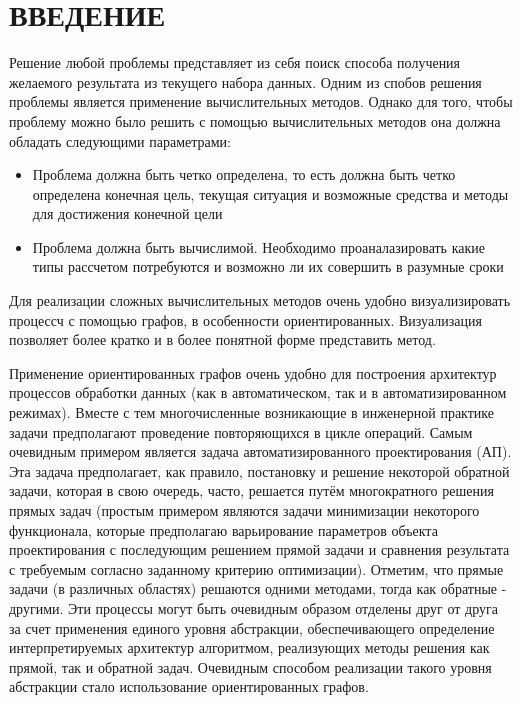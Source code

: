 \chapter*{ВВЕДЕНИЕ}\label{chap.introduction}


Решение любой проблемы представляет из себя поиск способа получения желаемого результата из текущего набора данных. Одним из спобов решения проблемы является применение вычислительных методов. Однако для того, чтобы проблему можно было решить с помощью вычислительных методов она должна обладать следующими параметрами:
\begin{itemize}
	\item Проблема должна быть четко определена, то есть должна быть четко определена конечная цель, текущая ситуация и возможные средства и методы для достижения конечной цели
	\item Проблема должна быть вычислимой. Необходимо проаналазировать какие типы рассчетом потребуются и возможно ли их совершить в разумные сроки
\end{itemize}
Для реализации сложных вычислительных методов очень удобно визуализировать процессч с помощью графов, в особенности ориентированных. Визуализация позволяет более кратко и в более понятной форме представить метод.

Применение ориентированных графов очень удобно для построения архитектур процессов обработки данных (как в автоматическом, так и в автоматизированном режимах). Вместе с тем многочисленные возникающие в инженерной практике задачи предполагают проведение повторяющихся в цикле операций. Самым очевидным примером является задача автоматизированного проектирования (АП). Эта задача предполагает, как правило, постановку и решение некоторой обратной задачи, которая в свою очередь, часто, решается путём многократного решения прямых задач (простым примером являются задачи минимизации некоторого функционала, которые предполагаю варьирование параметров объекта проектирования с последующим решением прямой задачи и сравнения результата с требуемым согласно заданному критерию оптимизации). Отметим, что прямые задачи (в различных областях) решаются одними методами, тогда как обратные - другими. Эти процессы могут быть очевидным образом отделены друг от друга за счет применения единого уровня абстракции, обеспечивающего определение интерпретируемых архитектур  алгоритмом, реализующих методы решения как прямой, так и обратной задач. Очевидным способом реализации такого уровня абстракции стало использование ориентированных графов.

